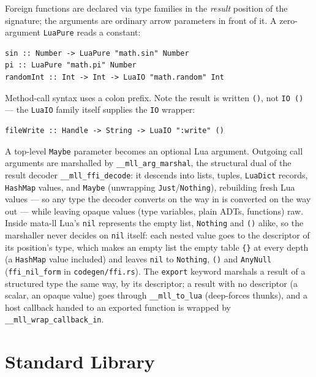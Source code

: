 \documentclass[11pt,a4paper]{article}
\begin{document}
Foreign functions are declared via type families in the \emph{result}
position of the signature; the arguments are ordinary arrow parameters
in front of it.  A zero-argument \texttt{LuaPure} reads a constant:
\begin{lstlisting}[language=MLL]
sin :: Number -> LuaPure "math.sin" Number
pi :: LuaPure "math.pi" Number
randomInt :: Int -> Int -> LuaIO "math.random" Int
\end{lstlisting}

Method-call syntax uses a colon prefix.  Note the result is written
\texttt{()}, not \texttt{IO ()} --- the \texttt{LuaIO} family itself
supplies the \texttt{IO} wrapper:
\begin{lstlisting}[language=MLL]
fileWrite :: Handle -> String -> LuaIO ":write" ()
\end{lstlisting}

A top-level \texttt{Maybe} parameter becomes an optional Lua argument.  Outgoing
call arguments are marshalled by \texttt{\_\_mll\_arg\_marshal}, the structural
dual of the result decoder \texttt{\_\_mll\_ffi\_decode}: it descends into lists,
tuples, \texttt{LuaDict} records, \texttt{HashMap} values, and \texttt{Maybe}
(unwrapping \texttt{Just}/\texttt{Nothing}), rebuilding fresh Lua values --- so
any type the decoder converts on the way in is converted on the way out --- while
leaving opaque values (type variables, plain ADTs, functions) raw.  Inside
mata-ll Lua's \texttt{nil} represents the empty list, \texttt{Nothing} and
\texttt{()} alike, so the marshaller never decides on \texttt{nil} itself: each
nested value goes to the descriptor of its position's type, which makes an empty
list the empty table \texttt{\{\}} at every depth (a \texttt{HashMap} value
included) and leaves \texttt{nil} to \texttt{Nothing}, \texttt{()} and
\texttt{AnyNull} (\texttt{ffi\_nil\_form} in \texttt{codegen/ffi.rs}).  The
\texttt{export} keyword marshals a result of a structured type the same way,
by its descriptor; a result with no descriptor (a scalar, an opaque value) goes
through \texttt{\_\_mll\_to\_lua} (deep-forces thunks), and a host callback
handed to an exported function is wrapped by
\texttt{\_\_mll\_wrap\_callback\_in}.

\section{Standard Library}
\end{document}
